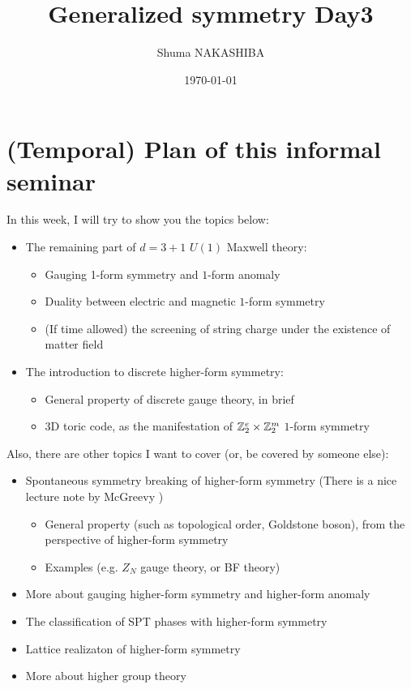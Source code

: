 \documentclass{ltjsarticle}
\title{Generalized symmetry Day3}
\author{Shuma NAKASHIBA}
\date{\today}
\theoremstyle{mystyle} %
\numberwithin{equation}{section}
\begin{document}
\maketitle

\setcounter{tocdepth}{2}
\tableofcontents
\newpage
\section{(Temporal) Plan of this informal seminar}
In this week, I will try to show you the topics below: 
\begin{itemize}
    \item The remaining part of $d=3+1$ $U(1)$ Maxwell theory: 
    \begin{itemize}
        \item Gauging 1-form symmetry and $1$-form anomaly
        \item Duality between electric and magnetic $1$-form symmetry
        \item (If time allowed) the screening of string charge under the existence of matter field
    \end{itemize}
    \item The introduction to discrete higher-form symmetry: 
    \begin{itemize}
        \item General property of discrete gauge theory, in brief
        \item 3D toric code, as the manifestation of $\mathbb{Z}^e_2\times \mathbb{Z}^m_2$ $1$-form symmetry
    \end{itemize}
\end{itemize}
Also, there are other topics I want to cover (or, be covered by someone else): 
\begin{itemize}
    \item Spontaneous symmetry breaking of higher-form symmetry
    (There is a nice lecture note by McGreevy \cite{MG})
    \begin{itemize}
        \item General property (such as topological order, Goldstone boson), from the perspective of higher-form symmetry
        \item Examples (e.g. $Z_{N}$ gauge theory, or BF theory)
    \end{itemize}
    \item More about gauging higher-form symmetry and higher-form anomaly
    \item The classification of SPT phases with higher-form symmetry
    \item Lattice realizaton of higher-form symmetry
    \item More about higher group theory
\end{itemize}
\end{document}
